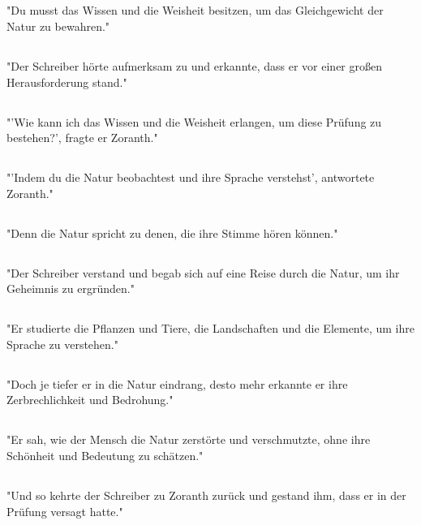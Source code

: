 \documentclass{article}
\begin{document}
\subsection{}
"Du musst das Wissen und die Weisheit besitzen, um das Gleichgewicht der Natur zu bewahren."
\subsection{}
"Der Schreiber hörte aufmerksam zu und erkannte, dass er vor einer großen Herausforderung stand."
\subsection{}
"'Wie kann ich das Wissen und die Weisheit erlangen, um diese Prüfung zu bestehen?', fragte er Zoranth."
\subsection{}
"'Indem du die Natur beobachtest und ihre Sprache verstehst', antwortete Zoranth."
\subsection{}
"Denn die Natur spricht zu denen, die ihre Stimme hören können."
\subsection{}
"Der Schreiber verstand und begab sich auf eine Reise durch die Natur, um ihr Geheimnis zu ergründen."
\subsection{}
"Er studierte die Pflanzen und Tiere, die Landschaften und die Elemente, um ihre Sprache zu verstehen."
\subsection{}
"Doch je tiefer er in die Natur eindrang, desto mehr erkannte er ihre Zerbrechlichkeit und Bedrohung."
\subsection{}
"Er sah, wie der Mensch die Natur zerstörte und verschmutzte, ohne ihre Schönheit und Bedeutung zu schätzen."
\subsection{}
"Und so kehrte der Schreiber zu Zoranth zurück und gestand ihm, dass er in der Prüfung versagt hatte."
\end{document}
